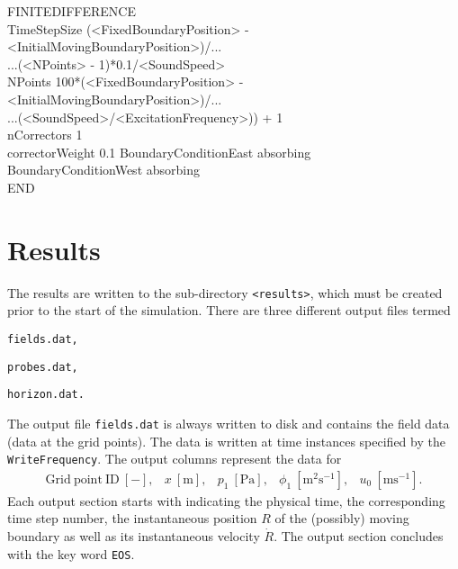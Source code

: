 {FINITEDIFFERENCE \\
TimeStepSize (<FixedBoundaryPosition> - <InitialMovingBoundaryPosition>)/... \\
\hspace*{3cm} ...(<NPoints> - 1)*0.1/<SoundSpeed> \\
NPoints 100*(<FixedBoundaryPosition> - <InitialMovingBoundaryPosition>)/... \\
\hspace*{3cm} ...(<SoundSpeed>/<ExcitationFrequency>)) + 1 \\
nCorrectors 1 \\
correctorWeight 0.1
BoundaryConditionEast absorbing \\
BoundaryConditionWest absorbing \\
END
}






\section{Results}
\label{sec:Results}

The results are written to the sub-directory {\tt <results>}, which must be created prior to the start of the simulation. There are three different output files termed
\begin{compactitem}
\item \tt fields.dat,
\item \tt probes.dat,
\item \tt horizon.dat.
\end{compactitem}
The output file {\tt fields.dat} is always written to disk and contains the field data (data at the grid points). The data is written at time instances specified by the {\tt WriteFrequency}. The output columns represent the data for
\begin{equation}
\begin{array}{lllll}
  \mathrm{Grid\:point\:ID\:\left[-\right]},
& x\:\mathrm{\left[m\right]},
& p_1\:\mathrm{\left[Pa\right]},
& \phi_1\:\mathrm{\left[m^2s^{-1}\right]},
& u_0\:\mathrm{\left[ms^{-1}\right]}.
\end{array}
\nonumber
\end{equation}
Each output section starts with indicating the physical time, the corresponding time step number, the instantaneous position $R$ of the (possibly) moving boundary as well as its instantaneous velocity $\dot R$. The output section concludes with the key word {\tt EOS}.

